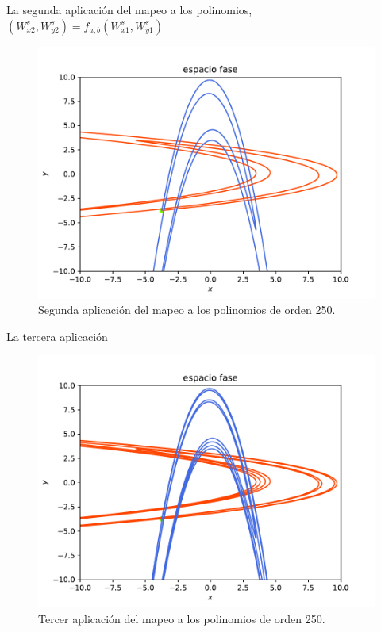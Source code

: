 \documentclass[11pt]{beamer}
\theoremstyle{definition}
\begin{document}
\begin{frame}
La segunda aplicación del mapeo a los polinomios, $(W_{x2}^{s},W_{y2}^{s})=f_{a,b}(W_{x1}^{s},W_{y1}^{s})$
\begin{figure}[h!]
	\centering
	\includegraphics[scale=0.6]{rectangulo2.pdf}
	\caption{Segunda aplicación del mapeo a los polinomios de orden 250.}
	\label{Rectangulo2}
\end{figure}

\end{frame}
\begin{frame}
La tercera aplicaci\'on
\begin{figure}[h!]
	\centering
	\includegraphics[scale=0.6]{rectangulo3.pdf}
	\caption{Tercer aplicación del mapeo a los polinomios de orden 250.}
	\label{Rectangulo3}
\end{figure}
\end{frame}
\end{document}
